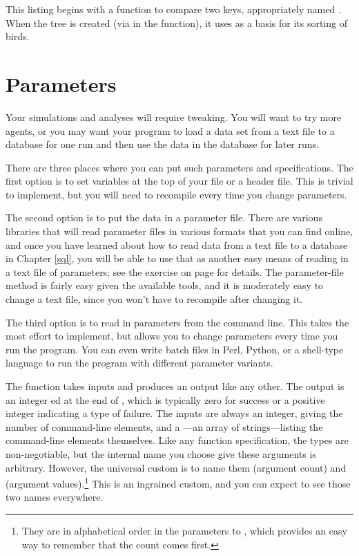 This listing begins with a function to compare two keys, appropriately
named . When the tree
is created (via  in the  function), it
uses  as a basis for its sorting of birds.



\section{Parameters} \label{paramsec}
Your simulations and analyses will require
tweaking. You will want to try more agents, or you may want your program
to load a data set from a text file to a database for one run and then
use the data in the database for later runs.

There are three places where you can put such parameters and
specifications. The first option is to set variables at the top of your 
file or a header file. This is trivial to implement, but you will need
to recompile every time you change parameters.

The second option is to put the data in a parameter file. There are
various libraries that will read parameter files in various formats that
you can find online, and once you have learned about how to read data
from a text file to a database in Chapter \ref{sql}, you will be able to
use that as another easy means of reading in a text file of
parameters; see the exercise on page \pageref{paramex} for details.
The parameter-file method is fairly easy given the available tools, and it is
moderately easy to change a text file, since you won't have to recompile
after changing it.

The third option is to read in parameters from the command line. This
takes the most effort to implement, but allows you to change parameters
every time you run the program. You can even write batch files in Perl,
Python, or a shell-type language to run the program with different parameter variants.

The  function takes inputs and produces an output like any
other. The output is an integer ed at the end of ,
which is typically zero for success or a positive integer indicating
a type of failure. The inputs are always an integer, giving the number
of command-line elements, and a ---an array of
strings---listing the command-line elements themselves. 
Like any function specification, the types are non-negotiable, but the
internal name you choose give these arguments is arbitrary. However, the
universal custom is to name them  (argument count) and
 (argument values).\footnote{They are in alphabetical order
in the parameters to , which provides an easy way to remember
that the count comes first.} This is an ingrained custom, and you can
expect to see those two names everywhere.

